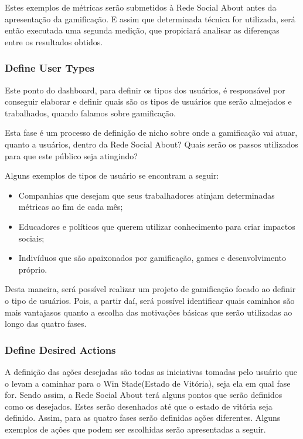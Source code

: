 Estes exemplos de métricas serão submetidos à Rede Social About antes da apresentação da
gamificação. E assim que determinada técnica for utilizada, será então executada
 uma
segunda medição, que propiciará analisar as diferenças entre os resultados obtidos.

\subsubsection{Define User Types}
\label{sub:define_user_types}
Este ponto do dashboard, para definir os tipos dos usuários, é responsável por conseguir
elaborar e definir quais são os tipos de usuários que serão almejados e trabalhados, quando
falamos sobre gamificação.

Esta fase é um processo de definição de nicho sobre onde a gamificação vai atuar, quanto a
usuários, dentro da Rede Social About? Quais serão os passos utilizados para que este público
seja atingindo?

Alguns exemplos de tipos de usuário se encontram a seguir:

\begin{itemize}
    \item Companhias que desejam que seus trabalhadores atinjam determinadas métricas
        ao fim de cada mês;
    \item Educadores e políticos que querem utilizar conhecimento para criar impactos
        sociais;
    \item Indivíduos que são apaixonados por gamificação, games e desenvolvimento próprio.
\end{itemize}

Desta maneira, será possível realizar um projeto de gamificação focado ao definir o tipo
de usuários. Pois, a partir daí, será possível identificar quais caminhos são mais vantajasos
quanto a escolha das motivações básicas que serão utilizadas ao longo das quatro fases.

\subsubsection{Define Desired Actions}
\label{sub:define_desired_actions}
A definição das ações desejadas são todas as iniciativas tomadas pelo usuário que o levam a caminhar para
o Win Stade(Estado de Vitória), seja ela em qual fase for. Sendo assim, a Rede Social
About terá alguns pontos que serão definidos como os desejados. Estes serão desenhados
até que o estado de vitória seja definido. Assim, para as quatro fases serão definidas
ações diferentes. Alguns exemplos de ações que podem ser escolhidas serão apresentadas
a seguir.

